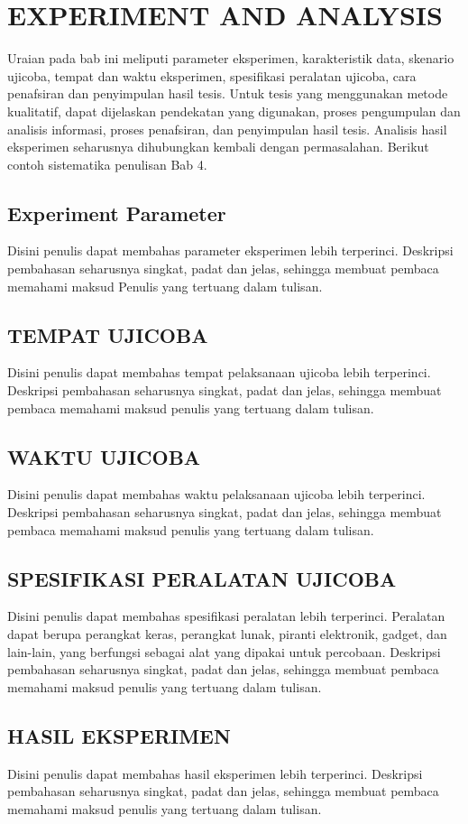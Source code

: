 \chapter{EXPERIMENT AND ANALYSIS}
Uraian pada bab ini meliputi parameter eksperimen, karakteristik data, skenario ujicoba, tempat dan waktu eksperimen, spesifikasi peralatan ujicoba, cara penafsiran dan penyimpulan hasil tesis. Untuk tesis yang menggunakan metode kualitatif, dapat dijelaskan pendekatan yang digunakan, proses pengumpulan dan analisis informasi, proses penafsiran, dan penyimpulan hasil tesis. Analisis hasil eksperimen seharusnya dihubungkan kembali dengan permasalahan. Berikut contoh sistematika penulisan Bab 4.
\section{Experiment Parameter}
Disini penulis dapat membahas parameter eksperimen lebih terperinci. Deskripsi pembahasan seharusnya singkat, padat dan jelas, sehingga membuat pembaca memahami maksud Penulis yang tertuang dalam tulisan.
\section{TEMPAT UJICOBA}
Disini penulis dapat membahas tempat pelaksanaan ujicoba lebih terperinci. Deskripsi pembahasan seharusnya singkat, padat dan jelas, sehingga membuat pembaca memahami maksud penulis yang tertuang dalam tulisan.
\section{WAKTU UJICOBA}
Disini penulis dapat membahas waktu pelaksanaan ujicoba lebih terperinci. Deskripsi pembahasan seharusnya singkat, padat dan jelas, sehingga membuat pembaca memahami maksud penulis yang tertuang dalam tulisan.
\section{SPESIFIKASI PERALATAN UJICOBA}
Disini penulis dapat membahas spesifikasi peralatan lebih terperinci. Peralatan dapat berupa perangkat keras, perangkat lunak, piranti elektronik, gadget, dan lain-lain, yang berfungsi sebagai alat yang dipakai untuk percobaan. Deskripsi pembahasan seharusnya singkat, padat dan jelas, sehingga membuat pembaca memahami maksud penulis yang tertuang dalam tulisan.
\section{HASIL EKSPERIMEN}
Disini penulis dapat membahas hasil eksperimen lebih terperinci. Deskripsi pembahasan seharusnya singkat, padat dan jelas, sehingga membuat pembaca memahami maksud penulis yang tertuang dalam tulisan.

